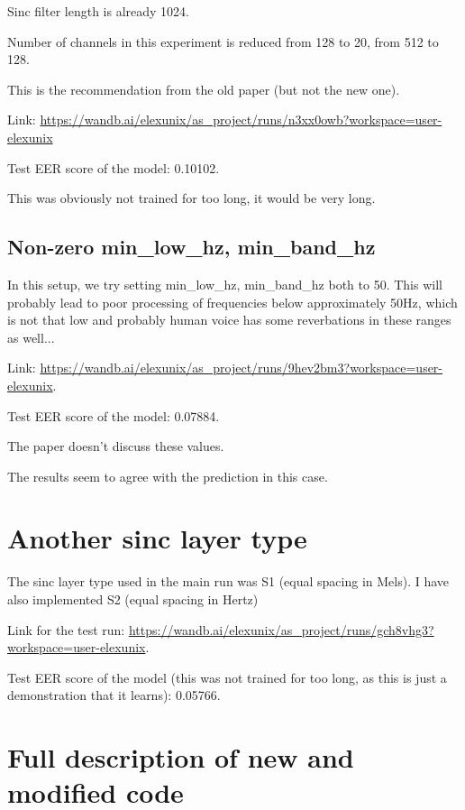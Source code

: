 \documentclass[a4paper]{article}
\begin{document}
Sinc filter length is already 1024.

Number of channels in this experiment is reduced from 128 to 20, from 512 to 128.

This is the recommendation from the old paper (but not the new one).

Link: \url{https://wandb.ai/elexunix/as_project/runs/n3xx0owb?workspace=user-elexunix}

Test EER score of the model: 0.10102.

This was obviously not trained for too long, it would be very long.

\subsection{Non-zero min\_low\_hz, min\_band\_hz}

In this setup, we try setting min\_low\_hz, min\_band\_hz both to 50. This will probably lead to poor processing of frequencies below approximately 50Hz, which is not that low and probably human voice has some reverbations in these ranges as well...

Link: \url{https://wandb.ai/elexunix/as_project/runs/9hev2bm3?workspace=user-elexunix}.

Test EER score of the model: 0.07884.

The paper doesn't discuss these values.

The results seem to agree with the prediction in this case.



\section{Another sinc layer type}

The sinc layer type used in the main run was S1 (equal spacing in Mels). I have also implemented S2 (equal spacing in Hertz)

Link for the test run: \url{https://wandb.ai/elexunix/as_project/runs/gch8vhg3?workspace=user-elexunix}.

Test EER score of the model (this was not trained for too long, as this is just a demonstration that it learns): 0.05766.



\section{Full description of new and modified code}
\end{document}
